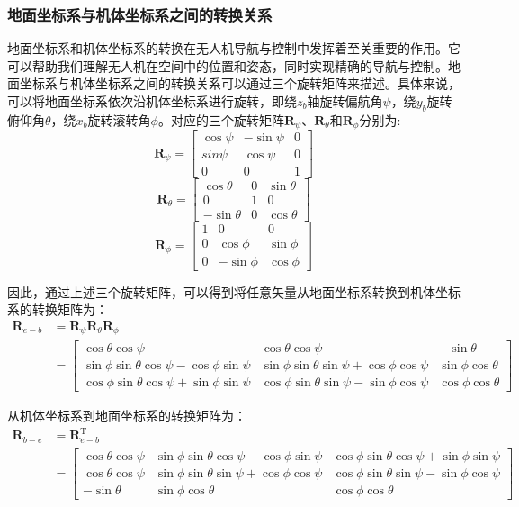 \documentclass[lang=chs, degree=master, blindreview=false, winfonts=true]{yanputhesis}
\begin{document}
\subsubsection{地面坐标系与机体坐标系之间的转换关系}
地面坐标系和机体坐标系的转换在无人机导航与控制中发挥着至关重要的作用。它可以帮助我们理解无人机在空间中的位置和姿态，同时实现精确的导航与控制。地面坐标系与机体坐标系之间的转换关系可以通过三个旋转矩阵来描述。具体来说，可以将地面坐标系依次沿机体坐标系进行旋转，即绕$z_b$轴旋转偏航角$\psi$，绕$y_b$旋转俯仰角$\theta$，绕$x_b$旋转滚转角$\phi$。对应的三个旋转矩阵$\boldsymbol{R}_\psi$、$\boldsymbol{R}_\theta$和$\boldsymbol{R}_\phi$分别为:
$$
\boldsymbol{R}_\psi=\begin{bmatrix}\cos\psi&-\sin\psi&0\\sin\psi&\cos\psi&0\\0&0&1\end{bmatrix} $$
$$	\boldsymbol{R}_\theta=\begin{bmatrix}\cos\theta&0&\sin\theta\\0&1&0\\-\sin\theta&0&\cos\theta\end{bmatrix} $$
$$\boldsymbol{R}_\phi=\begin{bmatrix}1&0&0\\0&\cos\phi&\sin\phi\\0&-\sin\phi&\cos\phi\end{bmatrix}
$$

因此，通过上述三个旋转矩阵，可以得到将任意矢量从地面坐标系转换到机体坐标系的转换矩阵为：
$$\begin{aligned}\boldsymbol{R}_{e-b}&=\boldsymbol{R}_{\psi}\boldsymbol{R}_{\theta}\boldsymbol{R}_{\phi}\\&=\begin{bmatrix}\cos\theta\cos\psi&\cos\theta\cos\psi&-\sin\theta\\\sin\phi\sin\theta\cos\psi-\cos\phi\sin\psi&\sin\phi\sin\theta\sin\psi+\cos\phi\cos\psi&\sin\phi\cos\theta\\\cos\phi\sin\theta\cos\psi+\sin\phi\sin\psi&\cos\phi\sin\theta\sin\psi-\sin\phi\cos\psi&\cos\phi\cos\theta\end{bmatrix}\end{aligned}$$

从机体坐标系到地面坐标系的转换矩阵为：
$$\begin{aligned}\boldsymbol{R}_{b-e}&=\bm{R}_{e-b}^\mathrm{T}\\&=\begin{bmatrix}\cos\theta\cos\psi&\sin\phi\sin\theta\cos\psi-\cos\phi\sin\psi&\cos\phi\sin\theta\cos\psi+\sin\phi\sin\psi\\\cos\theta\cos\psi&\sin\phi\sin\theta\sin\psi+\cos\phi\cos\psi&\cos\phi\sin\theta\sin\psi-\sin\phi\cos\psi\\-\sin\theta&\sin\phi\cos\theta&\cos\phi\cos\theta\end{bmatrix}\end{aligned}$$
\end{document}
